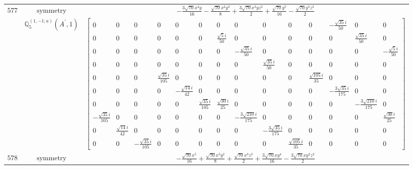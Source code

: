 \documentclass[fleqn,8pt,landscape]{jsarticle}
\begin{document}
\begin{longtable}{ccc}
$ 577 $ & $ \text{symmetry} $ & $ - \frac{3 \sqrt{70} x^{4} y}{16} - \frac{\sqrt{70} x^{2} y^{3}}{8} + \frac{3 \sqrt{70} x^{2} y z^{2}}{2} + \frac{\sqrt{70} y^{5}}{16} - \frac{\sqrt{70} y^{3} z^{2}}{2} $ \\
$  $ & $ \mathbb{Q}_{5}^{(1,-1;a)}(A^{\prime},1) $ & $ \begin{bmatrix} 0 & 0 & 0 & 0 & 0 & 0 & 0 & 0 & 0 & 0 & 0 & - \frac{\sqrt{35} i}{50} & 0 & 0 \\ 0 & 0 & 0 & 0 & 0 & 0 & \frac{\sqrt{5} i}{50} & 0 & 0 & 0 & 0 & 0 & \frac{\sqrt{35} i}{50} & 0 \\ 0 & 0 & 0 & 0 & 0 & 0 & 0 & - \frac{\sqrt{35} i}{50} & 0 & 0 & 0 & 0 & 0 & - \frac{\sqrt{5} i}{50} \\ 0 & 0 & 0 & 0 & 0 & 0 & 0 & 0 & \frac{\sqrt{35} i}{50} & 0 & 0 & 0 & 0 & 0 \\ 0 & 0 & 0 & \frac{\sqrt{35} i}{105} & 0 & 0 & 0 & 0 & 0 & 0 & \frac{\sqrt{105} i}{35} & 0 & 0 & 0 \\ 0 & 0 & 0 & 0 & - \frac{\sqrt{14} i}{42} & 0 & 0 & 0 & 0 & 0 & 0 & - \frac{3 \sqrt{35} i}{175} & 0 & 0 \\ 0 & 0 & 0 & 0 & 0 & \frac{\sqrt{35} i}{105} & \frac{\sqrt{30} i}{25} & 0 & 0 & 0 & 0 & 0 & - \frac{3 \sqrt{210} i}{175} & 0 \\ - \frac{\sqrt{35} i}{105} & 0 & 0 & 0 & 0 & 0 & 0 & - \frac{3 \sqrt{210} i}{175} & 0 & 0 & 0 & 0 & 0 & \frac{\sqrt{30} i}{25} \\ 0 & \frac{\sqrt{14} i}{42} & 0 & 0 & 0 & 0 & 0 & 0 & - \frac{3 \sqrt{35} i}{175} & 0 & 0 & 0 & 0 & 0 \\ 0 & 0 & - \frac{\sqrt{35} i}{105} & 0 & 0 & 0 & 0 & 0 & 0 & \frac{\sqrt{105} i}{35} & 0 & 0 & 0 & 0 \end{bmatrix} $ \\ \hline
$ 578 $ & $ \text{symmetry} $ & $ - \frac{\sqrt{70} x^{5}}{16} + \frac{\sqrt{70} x^{3} y^{2}}{8} + \frac{\sqrt{70} x^{3} z^{2}}{2} + \frac{3 \sqrt{70} x y^{4}}{16} - \frac{3 \sqrt{70} x y^{2} z^{2}}{2} $ \\

\end{longtable}
\end{document}
